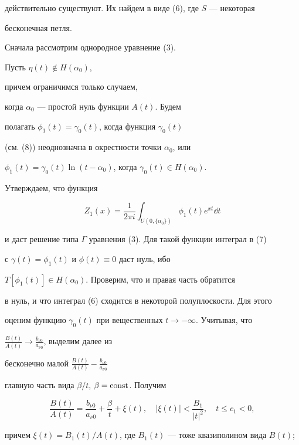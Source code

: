 действительно существуют. Их найдем в виде (6), где $S$ --- некоторая


бесконечная петля.





Сначала рассмотрим однородное уравнение (3).


Пусть $\eta(t)\notin H(\alpha_0)$,


причем ограничимся только случаем,


когда $\alpha_0$ --- простой нуль функции $A(t)$. Будем 


полагать $\phi_1(t)=\gamma_0(t)$, когда функция $\gamma_0(t)$


(см. (8)) неоднозначна в окрестности точки $\alpha_0$, или


$\phi_1(t)=\gamma_0(t)\ln(t-\alpha_0)$, когда $\gamma_0(t)\in H(\alpha_0)$.


Утверждаем, что функция


\begin{equation}


Z_1(x)=\frac{1}{2\pi i}\int_{U(0,\{ \alpha_0 \})}{\phi_1(t)e^{xt}\dd t}


\end{equation}


и даст решение типа $\Gamma$ уравнения (3). Для такой функции интеграл в (7)


с $\gamma(t)=\phi_1(t)$ и $\phi(t)\equiv 0$ даст нуль, ибо


$T[\phi_1(t)]\in H(\alpha_0)$. Проверим, что и правая часть обратится


в нуль, и что интеграл (6) сходится в некоторой полуплоскости. Для этого


оценим функцию $\gamma_0(t)$ при вещественных $t\to -\infty$. Учитывая, что


$\frac{B(t)}{A(t)} \to \frac{b_{\nu 0}}{a_{\nu 0}}$, выделим далее из


бесконечно малой $\frac{B(t)}{A(t)} - \frac{b_{\nu 0}}{a_{\nu 0}}$


главную часть вида $\beta/t$, $\beta=\operatorname{const}$. Получим


\begin{equation}


\frac{B(t)}{A(t)}=\frac{b_{\nu 0}}{a_{\nu 0}}+\frac{\beta}{t}+\xi(t),\quad


|\xi(t)|<\frac{B_1}{|t|^2},\quad t\le c_1 <0,


\end{equation}


причем $\xi(t)=B_1(t)/A(t)$, где $B_1(t)$ --- тоже квазиполином вида $B(t)$;


